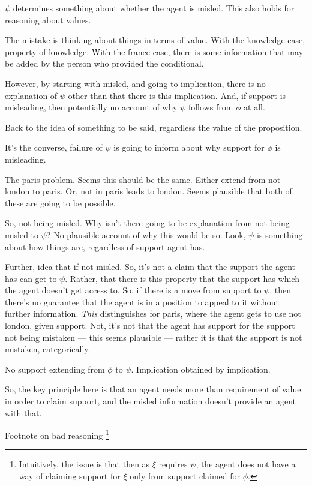 \begin{note}
  \(\psi\) determines something about whether the agent is misled.
  This also holds for reasoning about values.

  The mistake is thinking about things in terms of value.
  With the knowledge case, property of knowledge.
  With the france case, there is some information that may be added by the person who provided the conditional.

  However, by starting with misled, and going to implication, there is no explanation of \(\psi\) other than that there is this implication.
  And, if support is misleading, then potentially no account of why \(\psi\) follows from \(\phi\) at all.

  Back to the idea of something to be said, regardless the value of the proposition.

  It's the converse, failure of \(\psi\) is going to inform about why support for \(\phi\) is misleading.

  The paris problem.
  Seems this should be the same.
  Either extend from not london to paris.
  Or, not in paris leads to london.
  Seems plausible that both of these are going to be possible.

  So, not being misled.
  Why isn't there going to be explanation from not being misled to \(\psi\)?
  No plausible account of why this would be so.
  Look, \(\psi\) is something about how things are, regardless of support agent has.

  Further, idea that if not misled.
  So, it's not a claim that the support the agent has can get to \(\psi\).
  Rather, that there is this property that the support has which the agent doesn't get access to.
  So, if there is a move from support to \(\psi\), then there's no guarantee that the agent is in a position to appeal to it without further information.
  \emph{This} distinguishes for paris, where the agent gets to use not london, given support.
  Not, it's not that the agent has support for the support not being mistaken --- this seems plausible --- rather it is that the support is not mistaken, categorically.

  No support extending from \(\phi\) to \(\psi\).
  Implication obtained by implication.

  So, the key principle here is that an agent needs more than requirement of value in order to claim support, and the misled information doesn't provide an agent with that.

  Footnote on bad reasoning\nolinebreak
  \footnote{
    Intuitively, the issue is that then as \(\xi\) requires \(\psi\), the agent does not have a way of claiming support for \(\xi\) only from support claimed for \(\phi\).


}
\end{note}
